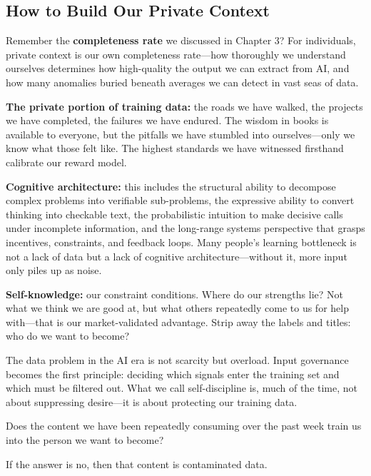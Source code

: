 \subsection{How to Build Our Private Context}

Remember the \textbf{completeness rate} we discussed in Chapter 3? For individuals, private context is our own completeness rate---how thoroughly we understand ourselves determines how high-quality the output we can extract from AI, and how many anomalies buried beneath averages we can detect in vast seas of data.

\vspace{1em}

\textbf{The private portion of training data:} the roads we have walked, the projects we have completed, the failures we have endured. The wisdom in books is available to everyone, but the pitfalls we have stumbled into ourselves---only we know what those felt like. The highest standards we have witnessed firsthand calibrate our reward model.

\textbf{Cognitive architecture:} this includes the structural ability to decompose complex problems into verifiable sub-problems, the expressive ability to convert thinking into checkable text, the probabilistic intuition to make decisive calls under incomplete information, and the long-range systems perspective that grasps incentives, constraints, and feedback loops. Many people's learning bottleneck is not a lack of data but a lack of cognitive architecture---without it, more input only piles up as noise.

\textbf{Self-knowledge:} our constraint conditions. Where do our strengths lie? Not what we think we are good at, but what others repeatedly come to us for help with---that is our market-validated advantage. Strip away the labels and titles: who do we want to become?

\vspace{1em}

The data problem in the AI era is not scarcity but overload. Input governance becomes the first principle: deciding which signals enter the training set and which must be filtered out.
What we call self-discipline is, much of the time, not about suppressing desire---it is about protecting our training data.


\begin{thinkbox}[Reflection]
Does the content we have been repeatedly consuming over the past week train us into the person we want to become?

If the answer is no, then that content is contaminated data.
\end{thinkbox}


